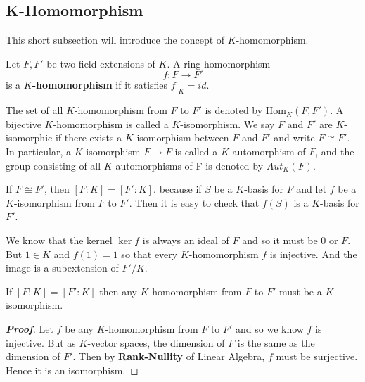 \subsection{K-Homomorphism}
This short subsection will introduce the concept of $K$-homomorphism.
\begin{definition} Let $F,F'$ be two field extensions of $K$. A ring homomorphism
$$f: F \rightarrow F'$$ is a {\bf $K$-homomorphism} if it satisfies $f|_K=id$.

The set of all $K$-homomorphism from $F$ to $F'$ is denoted by Hom$_K(F,F')$. A bijective $K$-homomorphism is called a $K$-isomorphism. We say $F$ and $F'$ are $K$-isomorphic if there exists a $K$-isomorphism between $F$ and $F'$ and write $F \cong F'$.
In particular, a $K$-isomorphism $F \rightarrow F$ is called a $K$-automorphism of $F$, and the group consisting
of all $K$-automorphisms of F is denoted by $Aut_K(F)$.
\end{definition}
\begin{example} If $F \cong F'$, then $[F:K]=[F':K]$. because if $S$ be a $K$-basis for $F$ and let $f$ be a $K$-isomorphism from $F$ to $F'$. Then it is easy to check that
$f(S)$ is a $K$-basis for $F'$.
\end{example}
\begin{remark} We know that the kernel $\ker{f}$ is always an ideal of $F$ and so it must be $0$ or $F$. But $1 \in K$ and $f(1)=1$ so that every $K$-homomorphism $f$ is injective. And the image is a subextension of $F'/K$.
\end{remark}
\begin{lemma} If $[F:K]=[F':K]$ then any $K$-homomorphism from $F$ to $F'$ must be a $K$-isomorphism.
\end{lemma}
\begin{proof}[\bf Proof] Let $f$ be any $K$-homomorphism from $F$ to $F'$ and so we know $f$ is injective. But as $K$-vector spaces,
the dimension of $F$ is the same as the dimension of $F'$. Then by {\bf Rank-Nullity} of Linear Algebra, $f$ must be surjective. Hence it is an isomorphism.
\end{proof}
